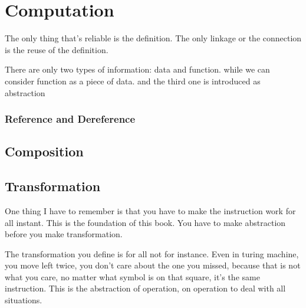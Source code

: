 \chapter{Computation}

The only thing that's reliable is the definition. The only linkage or the connection is the reuse of the definition.

There are only two types of information: data and function. while we can consider function as a piece of data. and the third one is introduced as abstraction  



\subsection{Reference and Dereference}

\section{Composition}

\section{Transformation}

One thing I have to remember is that you have to make the instruction work for all instant. This is the foundation of this book. You have to make abstraction before you make transformation.

The transformation you define is for all not for instance. Even in turing machine, you move left twice, you don't care about the one you missed, because that is not what you care, no matter what symbol is on that square, it's the same instruction. This is the abstraction of operation, on operation to deal with all situations.

